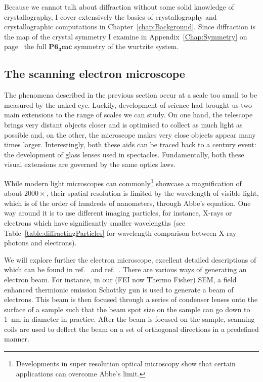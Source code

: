 Because we cannot talk about diffraction without some solid knowledge of crystallography, I cover extensively the basics of crystallography and crystallographic computations in Chapter~\ref{chap:Background}. Since diffraction is the map of the crystal symmetry I examine in Appendix~\ref{Chap:Symmetry} on page~\pageref{Chap:Symmetry} the full $\mathbf{P6_3mc}$ symmetry of the wurtzite system.  

\subsection{The scanning electron microscope}
\label{sec:sem}
The phenomena described in the previous section occur at a scale too small to be measured by the naked eye. Luckily,  development of science had brought us two main extensions  to the range of scales we can study. On one hand,  the telescope brings very distant objects closer and is optimised to collect as much light as possible and, on the other, the microscope makes very close objects appear many times larger.
Interestingly, both these aids can be traced back to a  century event: the development of glass lenses used in spectacles. Fundamentally, both these visual extensions are governed by the same optics laws. 

While modern light microscopes can commonly\footnote{ Developments in super resolution optical microscopy show that certain applications can overcome Abbe's limit.} showcase a magnification of about $2000\times$, their spatial resolution is limited by the wavelength of visible light, which is of the order of hundreds of nanometers, through Abbe's equation. One way around it is to use  different imaging particles, for instance, X-rays or electrons which have significantly smaller wavelengths (see Table~\ref{table:diffractingParticles} for wavelength comparison between X-ray photons and electrons).   

We will explore further the electron microscope, excellent detailed descriptions of which can be found in ref.~\cite{Hearle72} and ref.~\cite{reimerSEM}. There are various ways of generating an electron beam. For instance, in our (FEI now Thermo Fisher) SEM, a field enhanced thermionic emission Schottky gun is used to generate a beam of electrons. This beam is then focused through a series of condenser lenses onto the surface of a sample such that the beam spot size on the sample can go down to  \SI{1}{\nano \meter} in diameter in practice.  After the beam is focused on the sample, scanning coils are used to deflect the beam on a set of orthogonal directions in a predefined manner. 

